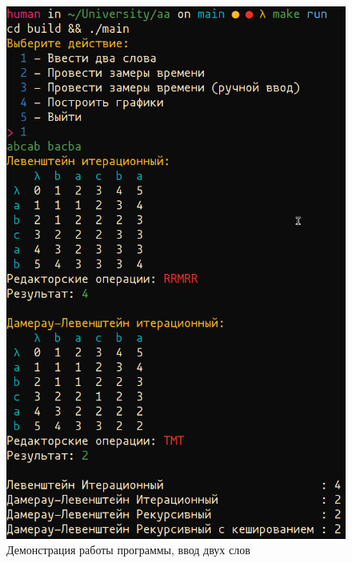 \begin{figure}[H]
	\centering
	\includegraphics[scale=0.7]{img/demo1.png}
	\caption{Демонстрация работы программы, ввод двух слов}
	\label{fig:demo1}
\end{figure}

